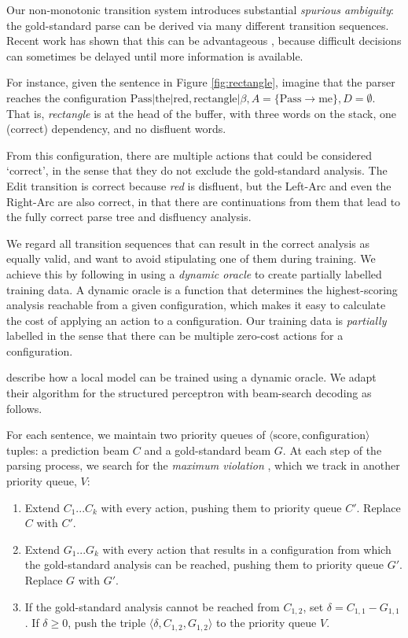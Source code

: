 \documentclass[11pt,letterpaper]{article}
\begin{document}
Our non-monotonic transition system introduces substantial \emph{spurious ambiguity}:
the gold-standard parse can be derived via many different transition sequences.
Recent work has shown that this can be advantageous
\citep{sartorio:13,honnibal:13,goldberg:12}, because difficult decisions can
sometimes be delayed until more information is available.

For instance, given the sentence in Figure \ref{fig:rectangle}, imagine that
the parser reaches the configuration $\mathrm{Pass} | \mathrm{the} | \mathrm{red}, \mathrm{rectangle} | \beta, A = \{ \mathrm{Pass} \rightarrow \mathrm{me} \}, D = \emptyset$. That is, \emph{rectangle}
is at the head of the buffer, with three words on the stack, one (correct) dependency,
and no disfluent words.

From this configuration, there are multiple actions that could be considered
`correct', in the sense that they do not exclude the gold-standard analysis.
The Edit transition is correct because \emph{red} is disfluent, but the
Left-Arc and even the Right-Arc are also correct, in that there are continuations
from them that lead to the fully correct parse tree and disfluency analysis.

We regard all transition sequences that can result in the correct analysis as
equally valid, and want to avoid stipulating one of them during training.  
We achieve this by following \citet{goldberg:12} in using a
\emph{dynamic oracle} to create partially labelled training data. 
A dynamic oracle is a function that determines the highest-scoring analysis reachable
from a given configuration, which makes it easy to calculate the cost of applying
an action to a configuration.  Our training data is \emph{partially} labelled
in the sense that there can be multiple zero-cost actions for a configuration.

\citet{goldberg:12} describe how a local model can be trained using a dynamic
oracle.  We adapt their algorithm for the structured perceptron with beam-search
decoding as follows.

For each sentence, we maintain two priority queues of
$\langle \mathrm{score}, \mathrm{configuration} \rangle$ tuples: a prediction
beam $C$ and a gold-standard beam $G$.
At each step of the parsing process, we search for the \emph{maximum violation}
\citep{huang:12}, which we track in another priority queue, $V$:

\begin{enumerate}
\itemsep0em
\item Extend $C_1...C_k$ with every action, pushing them to
      priority queue $C'$. Replace $C$ with $C'$.
\item Extend $G_1...G_k$ with every action that results in a
      configuration from which the gold-standard analysis can be reached, pushing
      them to priority queue $G'$. Replace $G$ with $G'$.
  \item If the gold-standard analysis cannot be reached from $C_{1,2}$, 
    set $\delta = C_{1,1} - G_{1,1}$. If $\delta \ge 0$, push the triple
    $\langle \delta, C_{1,2}, G_{1,2} \rangle$ to the priority queue $V$.
\end{enumerate}
\end{document}
